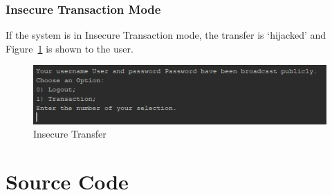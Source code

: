 \documentclass[12pt,twocolumn]{IEEEtran}
\begin{document}
\subsubsection{Insecure Transaction Mode}

If the system is in Insecure Transaction mode, the transfer is `hijacked' and Figure~\ref{fig:insecure} is shown to the user.

\begin{figure}[h!]
	\centering
	\includegraphics[width=0.4\linewidth]{./Resources/cli-bad.jpg}
	\caption{Insecure Transfer} \label{fig:insecure}
\end{figure}


\clearpage
\section{Source Code} \label{app:code}
\setcounter{figure}{0}  
\setcounter{equation}{0} 
\setcounter{table}{0}




















	
\end{document}
